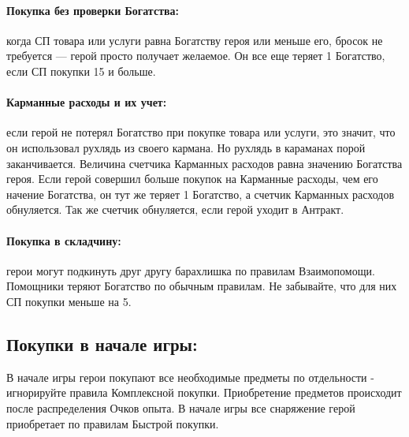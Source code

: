 \paragraph{Покупка без проверки Богатства:} когда СП товара или услуги равна Богатству героя или меньше его, бросок не требуется — герой просто получает желаемое. Он все еще теряет 1 Богатство, если СП покупки 15 и больше.
\paragraph{Карманные расходы и их учет:} если герой не потерял Богатство при покупке товара или услуги, это значит, что он использовал рухлядь из своего кармана. Но рухлядь в караманах порой заканчивается. 
\newline Величина счетчика Карманных расходов равна значению Богатства героя. Если герой совершил больше покупок на Карманные расходы, чем его начение Богатства, он тут же теряет 1 Богатство, а счетчик Карманных расходов обнуляется. Так же счетчик обнуляется, если герой уходит в Антракт.
\paragraph{Покупка в складчину:} герои могут подкинуть друг другу барахлишка по правилам Взаимопомощи. Помощники теряют Богатство по обычным правилам. Не забывайте, что для них СП покупки меньше на 5.

\subsection{Покупки в начале игры:}
В начале игры герои покупают все необходимые предметы по отдельности - игнорируйте правила Комплексной покупки. Приобретение предметов происходит после распределения Очков опыта. В начале игры все снаряжение герой приобретает по правилам Быстрой покупки.

